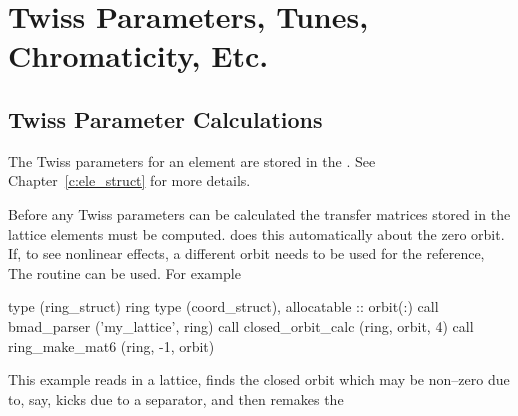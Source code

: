 \chapter{Twiss Parameters, Tunes, Chromaticity, Etc.}
\label{c:twiss}

\section{Twiss Parameter Calculations}
\label{s:twiss}

The Twiss parameters for an element are stored in the
. See Chapter~\ref{c:ele_struct} for more details.

Before any Twiss parameters can be calculated the transfer matrices
stored in the lattice elements must be computed.  does
this automatically about the zero orbit. If, to see nonlinear effects,
a different orbit needs to be used for the reference, The routine
 can be used. For example
\begin{example}
  type (ring_struct) ring
  type (coord_struct), allocatable :: orbit(:)
  call bmad_parser ('my_lattice', ring)
  call closed_orbit_calc (ring, orbit, 4)
  call ring_make_mat6 (ring, -1, orbit)
\end{example}
This example reads in a lattice, finds the closed orbit which may be
non--zero due to, say, kicks due to a separator, and then remakes the
